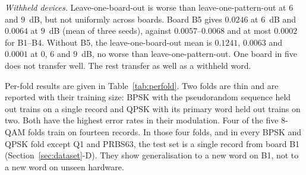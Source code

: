 \documentclass{ieeeaccess}
\begin{document}
\emph{Withheld devices.} Leave-one-board-out is worse than
leave-one-pattern-out at $6$ and $9$~dB, but not uniformly across boards. Board
B5 gives $0.0246$ at $6$~dB and $0.0064$ at $9$~dB (mean of three seeds),
against $0.0057$--$0.0068$ and at most $0.0002$ for B1--B4. Without B5, the
leave-one-board-out mean is $0.1241$, $0.0063$ and $0.0001$ at $0$, $6$ and $9$~dB, no worse than leave-one-pattern-out. One
board in five does not transfer well. The rest transfer as well as a withheld
word.

Per-fold results are given in Table~\ref{tab:perfold}. Two folds are thin and
are reported with their training size: BPSK with the pseudorandom sequence held
out trains on a single record and QPSK with its primary word held out trains on
two. Both have the highest error rates in their modulation. Four of the five
8-QAM folds train on fourteen records. In those four folds, and in every BPSK
and QPSK fold except Q1 and PRBS63, the test set is a single record from
board B1 (Section~\ref{sec:dataset}-D). They show generalisation to a new word
on B1, not to a new word on unseen hardware.
\end{document}
